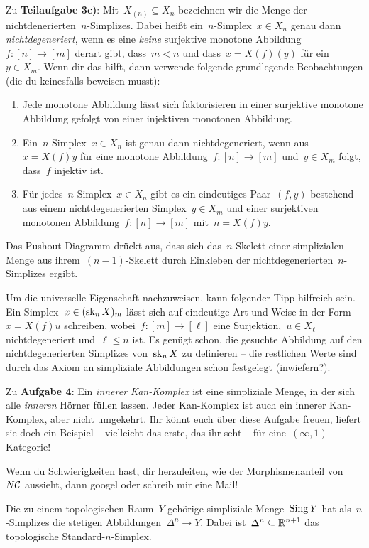 \documentclass{uebblatt}
\begin{document}
Zu \textbf{Teilaufgabe 3c)}: Mit~$X_{(n)} \subseteq X_n$ bezeichnen wir die
Menge der nichtdenerierten~$n$-Simplizes. Dabei heißt ein~$n$-Simplex~$x
\in X_n$ genau dann \emph{nichtdegeneriert}, wenn es eine \emph{keine} surjektive monotone
Abbildung~$f : [n] \to [m]$ derart gibt, dass~$m < n$ und dass~$x = X(f)(y)$ für ein~$y
\in X_m$. Wenn dir das hilft, dann verwende folgende grundlegende Beobachtungen
(die du keinesfalls beweisen musst):
\begin{enumerate}
\item Jede monotone Abbildung lässt sich faktorisieren in einer surjektive
monotone Abbildung gefolgt von einer injektiven monotonen Abbildung.
\item Ein~$n$-Simplex~$x \in X_n$ ist genau dann nichtdegeneriert, wenn aus~$x
= X(f)y$ für eine monotone Abbildung~$f : [n] \to [m]$ und~$y \in X_m$ folgt,
dass~$f$ injektiv ist.
\item Für jedes~$n$-Simplex~$x \in X_n$ gibt es ein eindeutiges Paar~$(f,y)$
bestehend aus einem nichtdegenerierten Simplex~$y \in X_m$ und einer
surjektiven monotonen Abbildung~$f : [n] \to [m]$ mit~$n = X(f)y$.
\end{enumerate}

Das Pushout-Diagramm drückt aus, dass sich das~$n$-Skelett einer simplizialen
Menge aus ihrem~$(n-1)$-Skelett durch Einkleben der
nichtdegenerierten~$n$-Simplizes ergibt.

Um die universelle Eigenschaft nachzuweisen, kann folgender Tipp hilfreich
sein. Ein Simplex~$x \in (\operatorname{sk}_n X)_m$ lässt sich auf eindeutige Art und
Weise in der Form~$x = X(f)u$ schreiben, wobei~$f : [m] \to [\ell]$ eine
Surjektion,~$u \in X_\ell$ nichtdegeneriert und~$\ell \leq n$ ist. Es genügt
schon, die gesuchte Abbildung auf den nichtdegenerierten Simplizes von~$\operatorname{sk}_n
X$ zu definieren -- die restlichen Werte sind durch das Axiom an simpliziale
Abbildungen schon festgelegt (inwiefern?).

Zu \textbf{Aufgabe 4}: Ein \emph{innerer Kan-Komplex} ist eine simpliziale
Menge, in der sich alle \emph{inneren} Hörner füllen lassen. Jeder Kan-Komplex
ist auch ein innerer Kan-Komplex, aber nicht umgekehrt. Ihr könnt euch über
diese Aufgabe freuen, liefert sie doch ein Beispiel -- vielleicht das erste,
das ihr seht -- für eine~$(\infty,1)$-Kategorie!

Wenn du Schwierigkeiten hast, dir herzuleiten, wie der Morphismenanteil
von~$N\mathcal{C}$ aussieht, dann googel oder schreib mir eine Mail!

Die zu einem topologischen Raum~$Y$ gehörige simpliziale Menge~$\operatorname{Sing} Y$ hat
als~$n$-Simplizes die stetigen Abbildungen~$\Delta^n \to Y$. Dabei
ist~$\Delta^n \subseteq \mathbb{R}^{n+1}$ das topologische Standard-$n$-Simplex.
\end{document}
